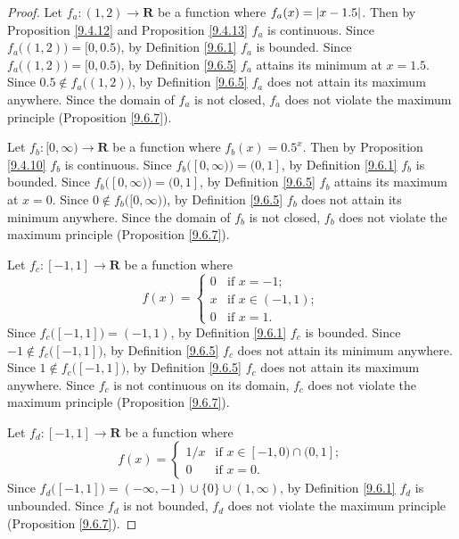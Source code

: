 \begin{proof}
    Let \(f_a : (1, 2) \to \mathbf{R}\) be a function where \(f_a(x) = \abs*{x - 1.5}\).
    Then by Proposition \ref{9.4.12} and Proposition \ref{9.4.13} \(f_a\) is continuous.
    Since \(f_a\big((1, 2)\big) = [0, 0.5)\), by Definition \ref{9.6.1} \(f_a\) is bounded.
    Since \(f_a\big((1, 2)\big) = [0, 0.5)\), by Definition \ref{9.6.5} \(f_a\) attains its minimum at \(x = 1.5\).
    Since \(0.5 \notin f_a\big((1, 2)\big)\), by Definition \ref{9.6.5} \(f_a\) does not attain its maximum anywhere.
    Since the domain of \(f_a\) is not closed, \(f_a\) does not violate the maximum principle (Proposition \ref{9.6.7}).

    Let \(f_b : [0, \infty) \to \mathbf{R}\) be a function where \(f_b(x) = 0.5^x\).
    Then by Proposition \ref{9.4.10} \(f_b\) is continuous.
    Since \(f_b\big([0, \infty)\big) = (0, 1]\), by Definition \ref{9.6.1} \(f_b\) is bounded.
    Since \(f_b\big([0, \infty)\big) = (0, 1]\), by Definition \ref{9.6.5} \(f_b\) attains its maximum at \(x = 0\).
    Since \(0 \notin f_b\big([0, \infty)\big)\), by Definition \ref{9.6.5} \(f_b\) does not attain its minimum anywhere.
    Since the domain of \(f_b\) is not closed, \(f_b\) does not violate the maximum principle (Proposition \ref{9.6.7}).

    Let \(f_c : [-1, 1] \to \mathbf{R}\) be a function where
    \[
        f(x) = \begin{cases}
            0 & \text{if } x = -1;        \\
            x & \text{if } x \in (-1, 1); \\
            0 & \text{if } x = 1.
        \end{cases}
    \]
    Since \(f_c\big([-1, 1]\big) = (-1, 1)\), by Definition \ref{9.6.1} \(f_c\) is bounded.
    Since \(-1 \notin f_c\big([-1, 1]\big)\), by Definition \ref{9.6.5} \(f_c\) does not attain its minimum anywhere.
    Since \(1 \notin f_c\big([-1, 1]\big)\), by Definition \ref{9.6.5} \(f_c\) does not attain its maximum anywhere.
    Since \(f_c\) is not continuous on its domain, \(f_c\) does not violate the maximum principle (Proposition \ref{9.6.7}).

    Let \(f_d : [-1, 1] \to \mathbf{R}\) be a function where
    \[
        f(x) = \begin{cases}
            1 / x & \text{if } x \in [-1, 0) \cap (0, 1]; \\
            0     & \text{if } x = 0.
        \end{cases}
    \]
    Since \(f_d\big([-1, 1]\big) = (-\infty, -1) \cup \{0\} \cup (1, \infty)\), by Definition \ref{9.6.1} \(f_d\) is unbounded.
    Since \(f_d\) is not bounded, \(f_d\) does not violate the maximum principle (Proposition \ref{9.6.7}).
\end{proof}

